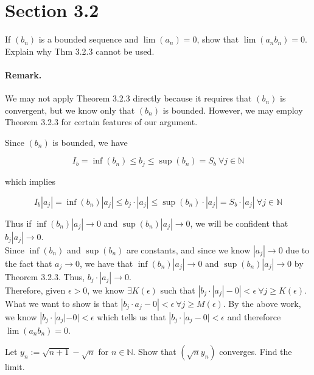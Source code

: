 \documentclass[paper=a4, fontsize=11pt]{scrartcl} %
\numberwithin{equation}{section} %
\numberwithin{figure}{section} %
\numberwithin{table}{section} %
\begin{document}
\section*{Section 3.2}
 If $(b_n)$ is a bounded sequence and $\lim(a_n) = 0$, show that $\lim(a_n b_n) = 0$. Explain why Thm 3.2.3 cannot be used.

\paragraph{Remark.} We may not apply Theorem 3.2.3 directly because it requires that $(b_n)$ is convergent, but we know only that $(b_n)$ is bounded. However, we may employ Theorem 3.2.3 for certain features of our argument.

\pf Since $(b_n)$ is bounded, we have

\begin{equation*}
I_b = \inf(b_n) \leq b_j \leq \sup(b_n) = S_b ~ \forall j \in \mathbb{N}
\end{equation*}

which implies

\begin{equation*}
I_b |a_j|  = \inf(b_n) |a_j| \leq b_j \cdot |a_j| \leq \sup(b_n) \cdot |a_j| = S_b \cdot |a_j| ~ \forall j \in \mathbb{N}
\end{equation*}

Thus if $\inf(b_n)|a_j| \rightarrow 0$ and $\sup(b_n) |a_j| \rightarrow 0$, we will be confident that $b_j |a_j| \rightarrow 0$.\\

Since $\inf(b_n)$ and $\sup(b_n)$ are constants, and since we know $|a_j| \rightarrow 0$ due to the fact that $a_j \rightarrow 0$, we have that $\inf(b_n) |a_j| \rightarrow 0$ and $\sup(b_n) |a_j| \rightarrow 0$ by Theorem 3.2.3. Thus, $b_j \cdot |a_j| \rightarrow 0$.\\

Therefore, given $\epsilon > 0$, we know $\exists K(\epsilon)$ such that $\left| b_j \cdot |a_j| - 0 \right| < \epsilon ~ \forall j \geq K(\epsilon)$.\\

What we want to show is that $|b_j \cdot a_j - 0| < \epsilon ~ \forall j \geq M(\epsilon)$. By the above work, we know $|b_j \cdot |a_j| - 0| < \epsilon$ which tells us that $|b_j \cdot |a_j - 0| < \epsilon$ and thereforce $\lim(a_n b_n) = 0$. \done

 Let $y_n := \sqrt{n+1} - \sqrt{n}$ for $n \in \mathbb{N}$. Show that $(\sqrt{n} y_n)$ converges. Find the limit.
\end{document}
